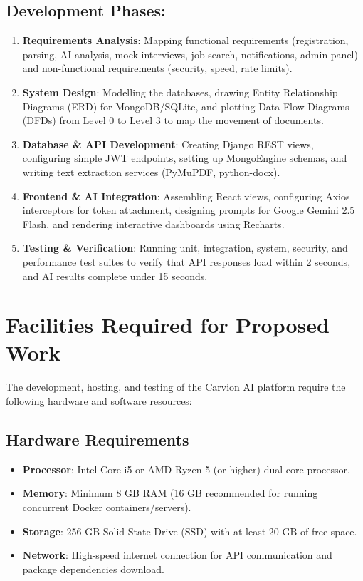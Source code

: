 \documentclass[12pt,a4paper]{article}
\begin{document}
\subsection{Development Phases:}
\begin{enumerate}
    \item \textbf{Requirements Analysis}: Mapping functional requirements (registration, parsing, AI analysis, mock interviews, job search, notifications, admin panel) and non-functional requirements (security, speed, rate limits).
    \item \textbf{System Design}: Modelling the databases, drawing Entity Relationship Diagrams (ERD) for MongoDB/SQLite, and plotting Data Flow Diagrams (DFDs) from Level 0 to Level 3 to map the movement of documents.
    \item \textbf{Database \& API Development}: Creating Django REST views, configuring simple JWT endpoints, setting up MongoEngine schemas, and writing text extraction services (PyMuPDF, python-docx).
    \item \textbf{Frontend \& AI Integration}: Assembling React views, configuring Axios interceptors for token attachment, designing prompts for Google Gemini 2.5 Flash, and rendering interactive dashboards using Recharts.
    \item \textbf{Testing \& Verification}: Running unit, integration, system, security, and performance test suites to verify that API responses load within 2 seconds, and AI results complete under 15 seconds.
\end{enumerate}

\clearpage

\section{Facilities Required for Proposed Work}

The development, hosting, and testing of the Carvion AI platform require the following hardware and software resources:

\subsection{Hardware Requirements}
\begin{itemize}
    \item \textbf{Processor}: Intel Core i5 or AMD Ryzen 5 (or higher) dual-core processor.
    \item \textbf{Memory}: Minimum 8 GB RAM (16 GB recommended for running concurrent Docker containers/servers).
    \item \textbf{Storage}: 256 GB Solid State Drive (SSD) with at least 20 GB of free space.
    \item \textbf{Network}: High-speed internet connection for API communication and package dependencies download.
\end{itemize}
\end{document}
